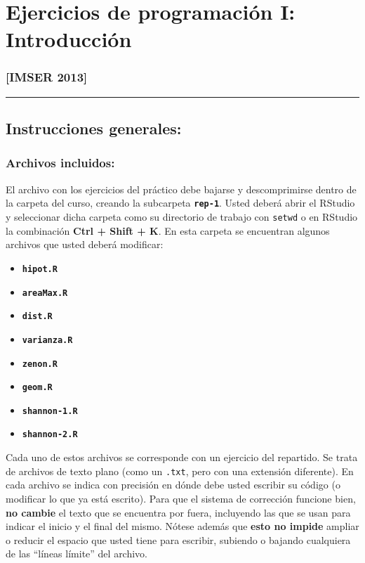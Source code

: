 \documentclass[]{article}
\begin{document}
\section{Ejercicios de programación I: Introducción}

\subsubsection{{[}IMSER 2013{]}}

\begin{center}\rule{3in}{0.4pt}\end{center}

\subsection{Instrucciones generales:}

\subsubsection{Archivos incluidos:}

El archivo con los ejercicios del práctico debe bajarse y descomprimirse
dentro de la carpeta del curso, creando la subcarpeta
\textbf{\texttt{rep-1}}. Usted deberá abrir el RStudio y seleccionar
dicha carpeta como su directorio de trabajo con \texttt{setwd} o en
RStudio la combinación \textbf{Ctrl + Shift + K}. En esta carpeta se
encuentran algunos archivos que usted deberá modificar:

\begin{itemize}
\item
  \textbf{\texttt{hipot.R}}
\item
  \textbf{\texttt{areaMax.R}}
\item
  \textbf{\texttt{dist.R}}
\item
  \textbf{\texttt{varianza.R}}
\item
  \textbf{\texttt{zenon.R}}
\item
  \textbf{\texttt{geom.R}}
\item
  \textbf{\texttt{shannon-1.R}}
\item
  \textbf{\texttt{shannon-2.R}}
\end{itemize}
Cada uno de estos archivos se corresponde con un ejercicio del
repartido. Se trata de archivos de texto plano (como un \texttt{.txt},
pero con una extensión diferente). En cada archivo se indica con
precisión en dónde debe usted escribir su código (o modificar lo que ya
está escrito). Para que el sistema de corrección funcione bien,
\textbf{no cambie} el texto que se encuentra por fuera, incluyendo las
que se usan para indicar el inicio y el final del mismo. Nótese además
que \textbf{esto no impide} ampliar o reducir el espacio que usted tiene
para escribir, subiendo o bajando cualquiera de las ``líneas límite''
del archivo.
\end{document}
